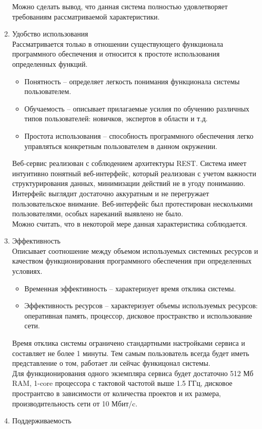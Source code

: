 \documentclass[a4paper,14pt]{extreport} %
\begin{document}
\begin{enumerate}
Можно сделать вывод, что данная система полностью удовлетворяет требованиям рассматриваемой характеристики.
\item Удобство использования \\
Рассматривается только в отношении существующего функционала программного обеспечения и относится к простоте использования определенных функций.
\begin{itemize}
\item Понятность -- определяет легкость понимания функционала системы пользователем.
\item Обучаемость -- описывает прилагаемые усилия по обучению различных типов пользователей: новичков, экспертов в области и т.д.
\item Простота использования -- способность программного обеспечения легко управляться конкретным пользователем в данном окружении.
\end{itemize}
Веб-сервис реализован с соблюдением архитектуры REST. Система имеет интуитивно понятный веб-интерфейс, который реализован с учетом важности структурирования данных, минимизации действий не в угоду пониманию. Интерфейс выглядит достаточно аккуратным и не перегружает пользовательское внимание. Веб-интерфейс был протестирован несколькими пользователями, особых нареканий выявлено не было. \\
Можно считать, что в некоторой мере данная характеристика соблюдается.
\item Эффективность \\
Описывает соотношение между объемом используемых системных ресурсов и качеством функционирования программного обеспечения при определенных условиях.
\begin{itemize}
\item Временная эффективность -- характеризует время отклика системы.
\item Эффективность ресурсов -- характеризует объемы используемых ресурсов: оперативная память, процессор, дисковое пространство и использование сети.
\end{itemize}
Время отклика системы ограничено стандартными настройками сервиса и составляет не более 1 минуты. Тем самым пользователь всегда будет иметь представление о том, работает ли сейчас функицонал системы. \\
Для функционирования одного экземпляра сервиса будет достаточно 512 Мб RAM, 1-core процессора с тактовой частотой выше 1.5 ГГц, дисковое пространтсво в зависимости от количества проектов и их размера, производительность сети от 10 Мбит/c.
\item Поддерживаемость \\

\end{enumerate}
\end{document}
